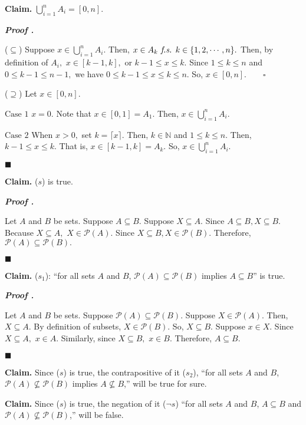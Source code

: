 \documentclass[11pt,letter]{article}
\newcounter{nq}[section]
\newcounter{np}[section]
\newenvironment*{p}{\par\noindent\textbf{\textit{Proof \stepcounter{np}\thenp. }}\par}{\par\hfill $\blacksquare$\par}
\newenvironment*{q}[1]{\noindent\emph{\thesection.\stepcounter{nq}\thenq$\quad $ #1}\par\noindent\texttt}{}
\newenvironment*{clm}{\par\noindent\textbf{Claim. }}{\par}
\def\N{{\mathbb{N}}}
\def\pwer{{\mathcal{P}}}
\def\fs{\emph{ f.s. }}
\def\dsst{\displaystyle}
\begin{document}
\begin{clm}
	$\dsst\bigcup_{i=1}^nA_i=[0,n].$	
\end{clm}
\begin{p}
	($\subseteq$) Suppose $x\in\dsst\bigcup_{i=1}^nA_i.$ Then, $x\in A_k\fs k\in\qty{1,2,\cdots,n}.$ Then, by definition of $A_i,$ $x\in[k-1,k],$ or $k-1\leq x\leq k.$ Since $1\leq k\leq n$ and $0\leq k-1\leq n-1,$ we have $0\leq k-1\leq x\leq k\leq n.$ So, $x\in[0,n].\qquad\square$\par 
	($\supseteq$) Let $x\in[0,n].$\par $\boxed{\text{Case }1}$ $x=0.$ Note that $x\in[0,1]=A_1.$ Then, $x\in\dsst\bigcup_{i=1}^nA_i.$\par $\boxed{\text{Case }2}$ When $x>0,$ set $k=\lceil x\rceil.$ Then, $k\in\N$ and $1\leq k\leq n.$ Then, $k-1\leq x\leq k.$ That is, $x\in[k-1,k]=A_k.$ So, $x\in\dsst\bigcup_{i=1}^nA_i.$
\end{p}

\begin{clm}
	($s$) is true.	
\end{clm}
\begin{p}
	Let $A$ and $B$ be sets. Suppose $A\subseteq B.$ Suppose $X\subseteq A.$ Since $A\subseteq B, X\subseteq B.$ Because $X\subseteq A,$ $X\in\pwer(A).$ Since $X\subseteq B, X\in\pwer(B).$ Therefore, $\pwer(A)\subseteq\pwer(B).$
\end{p}
\begin{clm}
	($s_1$): ``for all sets $A$ and $B$, $\pwer(A)\subseteq\pwer(B)$ implies $A\subseteq B$'' is true.	
\end{clm}
\begin{p}
	Let $A$ and $B$ be sets. Suppose $\pwer(A)\subseteq\pwer(B).$ Suppose $X\in\pwer(A).$ Then, $X\subseteq A.$ By definition of subsets, $X\in\pwer(B).$ So, $X\subseteq B.$	Suppose $x\in X.$ Since $X\subseteq A,$ $x\in A.$ Similarly, since $X\subseteq B,$ $x\in B.$ Therefore, $A\subseteq B.$
\end{p}
\begin{clm}
	Since ($s$) is true, the contrapositive of it ($s_2$), ``for all sets $A$ and $B$, $\pwer(A)\nsubseteq\pwer(B)$ implies $A\nsubseteq B$,'' will be true for sure.	
\end{clm}
\begin{clm}
	Since ($s$) is true, the negation of it ($\neg s$) ``for all sets $A$ and $B$, $A\subseteq B$ and $\pwer(A)\nsubseteq\pwer(B)$,'' will be false.	
\end{clm}
\end{document}
